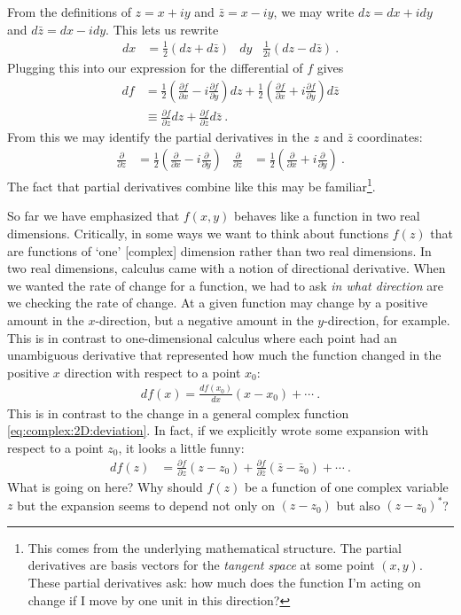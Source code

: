 \documentclass[
  11pt,
	colorful,
	raggedright,
]{tufte-style-thesis-flip}
\begin{document}
From the definitions of $z=x+iy$ and $\bar z = x-iy$, we may write $dz = dx+idy$ and $d\bar z = dx-idy$. This lets us rewrite
\begin{align}
  dx &= \frac{1}{2}(dz+d\bar z)
  &
  dy & \frac{1}{2i}(dz-d\bar z) \ .
\end{align}
Plugging this into our expression for the differential of $f$ gives
\begin{align}
  df &= \frac{1}{2}
  \left(
    \frac{\partial f}{\partial x}
    -i\frac{\partial f}{\partial y}
  \right)dz
  + 
  \frac{1}{2}
  \left(
    \frac{\partial f}{\partial x}
    +i\frac{\partial f}{\partial y}
  \right)d\bar z 
  \\
  &\equiv \frac{\partial f}{\partial z}dz
  + \frac{\partial f}{\partial \bar z}d\bar z
  \label{eq:complex:2D:deviation}
  \ .
\end{align}
From this we may identify the partial derivatives in the $z$ and $\bar z$ coordinates:
\begin{align}
  \frac{\partial}{\partial z} &= 
  \frac{1}{2}
  \left(
  \frac{\partial}{\partial x}
  -i
  \frac{\partial}{\partial y}
  \right)
  &
  \frac{\partial}{\partial \bar z} &= 
  \frac{1}{2}
  \left(
  \frac{\partial}{\partial x}
  +i
  \frac{\partial}{\partial y}
  \right) 
  \ .
  \label{eq:ddz:ddzst}
\end{align}
The fact that partial derivatives combine like this may be familiar\footnote{This comes from the underlying mathematical structure. The partial derivatives are basis vectors for the \emph{tangent space} at some point $(x,y)$. These partial derivatives ask: how much does the function I'm acting on change if I move by one unit in this direction?}. 

So far we have emphasized that $f(x,y)$ behaves like a function in two real dimensions. Critically, in some ways we want to think about functions $f(z)$ that are functions of `one' [complex] dimension rather than two real dimensions. In two real dimensions, calculus came with a notion of directional derivative. When we wanted the rate of change for a function, we had to ask \emph{in what direction} are we checking the rate of change. At a given function may change by a positive amount in the $x$-direction, but a negative amount in the $y$-direction, for example. This is in contrast to one-dimensional calculus where each point had an unambiguous derivative that represented how much the function changed in the positive $x$ direction with respect to a point $x_0$:
\begin{align}
  df(x) = \frac{d f(x_0)}{d x} (x-x_0) + \cdots \ .
\end{align}
This is in contrast to the change in a general complex function \eqref{eq:complex:2D:deviation}. In fact, if we explicitly wrote some expansion with respect to a point $z_0$, it looks a little funny:
\begin{align}
  df(z) &= 
  \frac{\partial f}{\partial z}(z-z_0) +
  \frac{\partial f}{\partial \bar z}(\bar z-\bar z_0) + \cdots \ .
\end{align}
What is going on here? Why should $f(z)$ be a function of one complex variable $z$ but the expansion seems to depend not only on $(z-z_0)$ but also $(z-z_0)^*$? 
\end{document}
